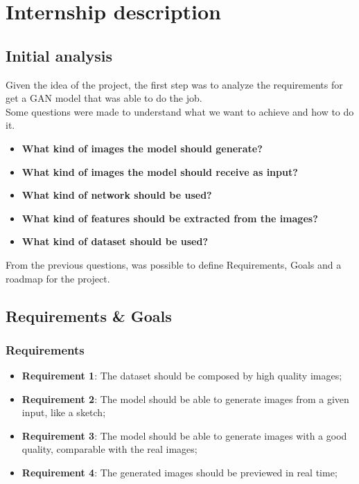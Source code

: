\chapter{Internship description}
\label{cap:descrizione-stage}


\section{Initial analysis}
Given the idea of the project, the first step was to analyze the requirements for get a GAN model that was able to do the job.\\
Some questions were made to understand what we want to achieve and how to do it.\\
\begin{itemize}
    \item \textbf{What kind of images the model should generate?}
    \item \textbf{What kind of images the model should receive as input?}
    \item \textbf{What kind of network should be used?}
    \item \textbf{What kind of features should be extracted from the images?}
    \item \textbf{What kind of dataset should be used?}
\end{itemize}

From the previous questions, was possible to define Requirements, Goals and a roadmap for the project.\\

\section{Requirements \& Goals}
\subsection{Requirements}
\begin{itemize}
    \item \textbf{Requirement 1}: The dataset should be composed by high quality images;
    \item \textbf{Requirement 2}: The model should be able to generate images from a given input, like a sketch;
    \item \textbf{Requirement 3}: The model should be able to generate images with a good quality, comparable with the real images;
    \item \textbf{Requirement 4}: The generated images should be previewed in real time;
\end{itemize}
